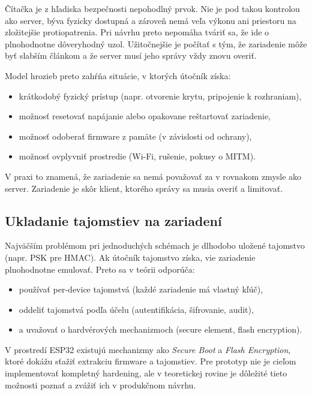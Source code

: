 \documentclass[journal,a4paper,onecolumn]{IEEEtran}
\begin{document}
Čítačka je z hľadiska bezpečnosti nepohodlný prvok. Nie je pod takou kontrolou ako server, býva fyzicky dostupná a zároveň nemá veľa výkonu ani priestoru na zložitejšie protiopatrenia. Pri návrhu preto nepomáha tváriť sa, že ide o plnohodnotne dôveryhodný uzol. Užitočnejšie je počítať s tým, že zariadenie môže byť slabším článkom a že server musí jeho správy vždy znovu overiť.

Model hrozieb preto zahŕňa situácie, v ktorých útočník získa:

\begin{itemize}[leftmargin=*,itemsep=2pt]
  \item krátkodobý fyzický prístup (napr. otvorenie krytu, pripojenie k rozhraniam),
  \item možnosť resetovať napájanie alebo opakovane reštartovať zariadenie,
  \item možnosť odoberať firmware z pamäte (v závislosti od ochrany),
  \item možnosť ovplyvniť prostredie (Wi-Fi, rušenie, pokusy o MITM).
\end{itemize}

V praxi to znamená, že zariadenie sa nemá považovať za  v rovnakom zmysle ako server. Zariadenie je skôr klient, ktorého správy sa musia overiť a limitovať.

\subsection{Ukladanie tajomstiev na zariadení}

Najväčším problémom pri jednoduchých schémach je dlhodobo uložené tajomstvo (napr. PSK pre HMAC). Ak útočník tajomstvo získa, vie zariadenie plnohodnotne emulovať. Preto sa v teórii odporúča:

\begin{itemize}[leftmargin=*,itemsep=2pt]
  \item používať per-device tajomstvá (každé zariadenie má vlastný kľúč),
  \item oddeliť tajomstvá podľa účelu (autentifikácia, šifrovanie, audit),
  \item a uvažovať o hardvérových mechanizmoch (secure element, flash encryption).
\end{itemize}

V prostredí ESP32 existujú mechanizmy ako \emph{Secure Boot} a \emph{Flash Encryption}, ktoré dokážu sťažiť extrakciu firmware a tajomstiev. Pre prototyp nie je cieľom implementovať kompletný hardening, ale v teoretickej rovine je dôležité tieto možnosti poznať a zvážiť ich v produkčnom návrhu.
\end{document}
